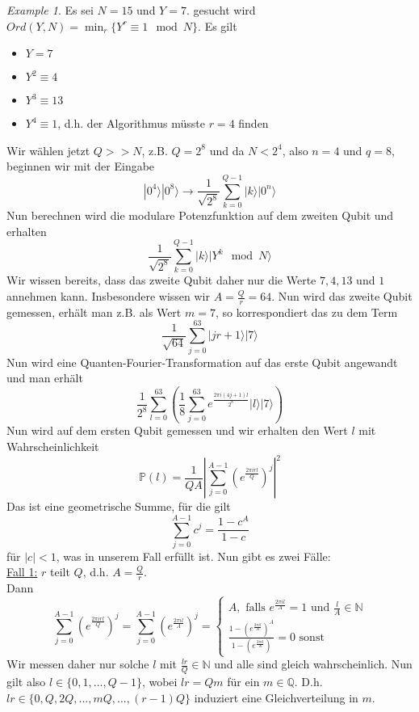 \documentclass[a4paper, 12pt]{article}
\theoremstyle{plain}
\theoremstyle{definition}
\theoremstyle{lemma}
\theoremstyle{remark}
\theoremstyle{example}
\newtheorem{example}[theorem]{Example}
\begin{document}
	\begin{example}
		Es sei $N=15$ und $Y=7$. gesucht wird $Ord(Y,N) = \min_r \{Y^r \equiv 1 \mod N\}$. Es gilt \begin{itemize}
			\item $Y = 7$
			\item $Y^2 \equiv 4$
			\item $Y^3 \equiv 13$
			\item $Y^4 \equiv 1$, d.h. der Algorithmus müsste $r = 4$ finden
		\end{itemize}
		Wir wählen jetzt $Q>>N$, z.B. $Q = 2^8$ und da $N < 2^4$, also $n=4$ und $q=8$, beginnen wir mit der Eingabe \[|0^4\rangle|0^8\rangle \to \frac{1}{\sqrt{2^8}} \sum_{k=0}^{Q-1} |k\rangle|0^n\rangle\]
		Nun berechnen wird die modulare Potenzfunktion auf dem zweiten Qubit und erhalten \[\frac{1}{\sqrt{2^8}}\sum_{k=0}^{Q-1} |k\rangle |Y^k \mod N\rangle\] Wir wissen bereits, dass das zweite Qubit daher nur die Werte $7,4,13$ und $1$ annehmen kann. Insbesondere wissen wir $A =\frac{Q}{r} = 64$. Nun wird das zweite Qubit gemessen, erhält man z.B. als Wert $m=7$, so korrespondiert das zu dem Term \[\frac{1}{\sqrt{64}}\sum_{j=0}^{63} |jr+1\rangle |7\rangle\]
		Nun wird eine Quanten-Fourier-Transformation auf das erste Qubit angewandt und man erhält \[\frac{1}{2^8} \sum_{l=0}^{63}\left(\frac{1}{8}\sum_{j=0}^{63} e^{\frac{2\pi i (4j+1)l}{2^8}}|l\rangle |7\rangle\right)\]
		Nun wird auf dem ersten Qubit gemessen und wir erhalten den Wert $l$ mit Wahrscheinlichkeit \[\mathbb{P}(l) = \frac{1}{QA}\left|\sum_{j=0}^{A-1} \left(e^{\frac{2\pi i rl}{Q}}\right)^j\right|^2\]
		Das ist eine geometrische Summe, für die gilt \[\sum_{j=0}^{A-1} c^j = \frac{1-c^A}{1-c}\] für $\left|c\right|<1$, was in unserem Fall erfüllt ist. Nun gibt es zwei Fälle:\\
		\underline{Fall 1:} $r$ teilt $Q$, d.h. $A = \frac{Q}{r}$.\\
		Dann \[\sum_{j=0}^{A-1} \left(e^{\frac{2\pi i rl}{Q}}\right)^j = \sum_{j=0}^{A-1} \left(e^{\frac{2\pi i l}{A}}\right)^j = \begin{cases}
			A, \text{ falls } e^{\frac{2 \pi i l}{A}} = 1 \text{ und } \frac{l}{A} \in \mathbb{N}                     \\
			\frac{1-\left(e^{\frac{2 \pi i l}{A}}\right)^A}{1-\left(e^{\frac{2 \pi i l}{A}}\right)} = 0 \text{ sonst}
		\end{cases}\]
		Wir messen daher nur solche $l$ mit $\frac{lr}{Q} \in \mathbb{N}$ und alle sind gleich wahrscheinlich. Nun gilt also $l \in \{0,1,...,Q-1\}$, wobei $lr = Qm$ für ein $m \in \mathbb{Q}$. D.h. $lr \in \{0,Q,2Q,...,mQ,...,(r-1)Q\}$ induziert eine Gleichverteilung in $m$.\\

\end{example}
\end{document}
